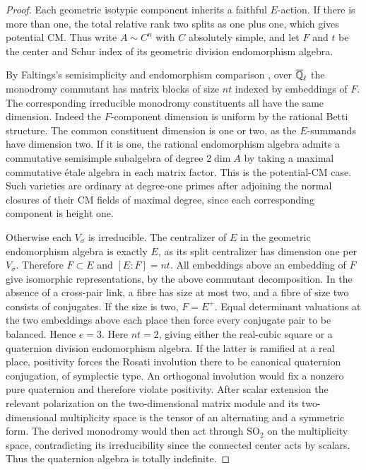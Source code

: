 \begin{proof}
Each geometric isotypic component inherits a faithful \(E\)-action.
If there is more than one, the total relative rank two splits as
one plus one, which gives potential CM. Thus write \(A\sim C^n\)
with \(C\) absolutely simple, and let \(F\) and \(t\) be the center
and Schur index of its geometric division endomorphism algebra.

By Faltings's semisimplicity and endomorphism comparison
\cite[Theorems~3--4]{faltings}, over
\(\overline{\mathbb Q}_\ell\) the monodromy commutant has matrix blocks of
size \(nt\) indexed by embeddings of \(F\). The corresponding
irreducible monodromy constituents all have the same dimension.
Indeed the \(F\)-component dimension is uniform by the rational
Betti structure. The common constituent dimension is one or two,
as the \(E\)-summands have dimension two. If it is one, the
rational endomorphism algebra admits a commutative semisimple
subalgebra of degree \(2\dim A\) by taking a maximal commutative
\'{e}tale algebra in each matrix factor. This is the potential-CM
case. Such varieties are ordinary at degree-one primes after
adjoining the normal closures of their CM fields of maximal
degree, since each corresponding component is height one.

Otherwise each \(V_\sigma\) is irreducible. The centralizer of
\(E\) in the geometric endomorphism algebra is exactly \(E\),
as its split centralizer has dimension one per \(V_\sigma\).
Therefore \(F\subset E\) and \([E:F]=nt\).
All embeddings above an embedding of \(F\) give isomorphic
representations, by the above commutant decomposition. In the
absence of a cross-pair link, a fibre has size at most two,
and a fibre of size two consists of conjugates.
If the size is two, \(F=E^+\). Equal determinant valuations
at the two embeddings above each place then force every
conjugate pair to be balanced. Hence \(e=3\).
Here \(nt=2\), giving either the real-cubic square or a quaternion
division endomorphism algebra. If the latter is ramified at a
real place, positivity forces the Rosati involution there to be
canonical quaternion conjugation, of symplectic type. An
orthogonal involution would fix a nonzero pure quaternion and
therefore violate positivity. After scalar extension the relevant
polarization on the two-dimensional matrix module and its
two-dimensional multiplicity space is the tensor of an alternating
and a symmetric form. The derived monodromy would then act through
\(\mathrm{SO}_2\) on the multiplicity space, contradicting its
irreducibility since the connected center acts by scalars.
Thus the quaternion algebra is totally indefinite.


\end{proof}
